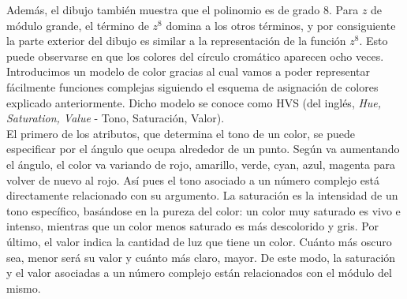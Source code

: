 Además, el dibujo también muestra que el polinomio es de grado $8$. Para $z$ de módulo grande, el término de $z^8$ domina a los otros términos, y por consiguiente la parte exterior del dibujo es similar a la representación de la función $z^8$. Esto puede observarse en que los colores del círculo cromático aparecen ocho veces. \\

Introducimos un modelo de color gracias al cual vamos a poder representar fácilmente funciones complejas siguiendo el esquema de asignación de colores explicado anteriormente. Dicho modelo se conoce como HVS (del inglés, \textit{Hue, Saturation, Value} - Tono, Saturación, Valor). \\

El primero de los atributos, que determina el tono de un color, se puede especificar por el ángulo que ocupa alrededor de un punto. Según va aumentando el ángulo, el color va variando de rojo, amarillo, verde, cyan, azul, magenta para volver de nuevo al rojo. Así pues el tono asociado a un número complejo está directamente relacionado con su argumento. La saturación es la intensidad de un tono específico, basándose en la pureza del color: un color muy saturado es vivo e intenso, mientras que un color menos saturado es más descolorido y gris. Por último, el valor indica la cantidad de luz que tiene un color. Cuánto más oscuro sea, menor será su valor y cuánto más claro, mayor. De este modo, la saturación y el valor asociadas a un número complejo están relacionados con el módulo del mismo. \\


